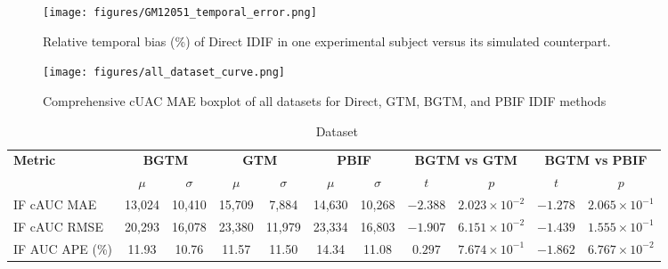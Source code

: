\begin{figure}[h]
	\centering
	\texttt{[image: figures/GM12051\_temporal\_error.png]}
	\caption{Relative temporal bias (\%) of Direct IDIF in one experimental subject versus its simulated counterpart.}
	\label{fig:sim_temporal_err}
\end{figure}
\begin{figure}[h]
	\centering
	\texttt{[image: figures/all\_dataset\_curve.png]}
	\caption{Comprehensive cUAC MAE boxplot of all datasets for Direct, GTM, BGTM, and PBIF IDIF methods}
	\label{fig:all_dataset_curves}
\end{figure}
\begin{sidewaystable}[b]
	\centering
	\small
	\setlength{\tabcolsep}{10pt}
	\caption*{\fdg\ Dataset}
	\begin{tabular}{l|cc|cc|cc|cc|cc}
		\toprule
		\multirow{2}{*}{\textbf{Metric}} & \multicolumn{2}{c|}{\textbf{BGTM}} & \multicolumn{2}{c|}{\textbf{GTM}} & \multicolumn{2}{c|}{\textbf{PBIF}} & \multicolumn{2}{c|}{\textbf{BGTM vs GTM}} & \multicolumn{2}{c}{\textbf{BGTM vs PBIF}}                                                                                                                  \\
		\cmidrule(lr){2-3} \cmidrule(lr){4-5} \cmidrule(lr){6-7} \cmidrule(lr){8-9} \cmidrule(lr){10-11}
		                                 & \(\mu\)                            & \(\sigma\)                        & \(\mu\)                            & \(\sigma\)                                & \(\mu\)                                   & \(\sigma\) & \(t\)      & \(p\)                              & \(t\)      & \(p\)                              \\
		\midrule
		IF cAUC MAE                      & 13{,}024                           & 10{,}410                          & 15{,}709                           & 7{,}884                                   & 14{,}630                                  & 10{,}268   & \(-2.388\) & \(2.023\times 10^{-2}\) \sym{*}    & \(-1.278\) & \(2.065\times 10^{-1}\)            \\
		IF cAUC RMSE                     & 20{,}293                           & 16{,}078                          & 23{,}380                           & 11{,}979                                  & 23{,}334                                  & 16{,}803   & \(-1.907\) & \(6.151\times 10^{-2}\) \sym{\dag} & \(-1.439\) & \(1.555\times 10^{-1}\)            \\
		IF AUC APE (\%)                  & 11.93                              & 10.76                             & 11.57                              & 11.50                                     & 14.34                                     & 11.08      & \(0.297\)  & \(7.674\times 10^{-1}\)            & \(-1.862\) & \(6.767\times 10^{-2}\) \sym{\dag} \\

\end{tabular}
\end{sidewaystable}
